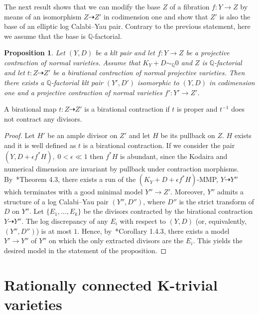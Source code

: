 \documentclass[11pt]{ip-journal}
\newtheorem{proposition}[theorem]{Proposition}
\theoremstyle{definition}
\begin{document}
The next result shows that we can modify the base $Z$ of a fibration $f \colon Y \to Z$ by means of an isomorphism $Z \dashrightarrow Z'$  in codimension one and show that $Z'$ is also the base of an elliptic log Calabi--Yau pair. Contrary to the previous statement, here we assume that the base is $\mathbb{Q}$-factorial.

\begin{proposition}
\label{bir.contr.lcy.prop}
Let $(Y, D)$ be a klt pair and let $f \colon Y \to Z$ be a projective contraction of normal varieties.
Assume that $K_Y+D \sim_{\mathbb{Q}} 0$ and $Z$ is $\mathbb{Q}$-factorial and let $t\colon Z \dashrightarrow Z'$ be a birational contraction of normal projective varieties.
Then there exists a $\mathbb{Q}$-factorial klt pair $(Y',D')$ isomorphic to $(Y, D)$ in codimension one and a projective contraction of normal varieties $f' \colon Y' \to Z'$.
\end{proposition}
 
A birational map $t \colon Z \dashrightarrow Z'$ is a birational contraction if $t$ is proper and $t^{-1}$ does not contract any divisors.

\begin{proof}
Let $H'$ be an ample divisor on $Z'$ and let $H$ be its pullback on $Z$. 
$H$ exists and it is well defined as $t$ is a birational contraction.
If we consider the pair $(Y, D+ \epsilon f^\ast H), \; 0<\epsilon\ll 1$ then $f^\ast H$ is abundant, since the Kodaira and numerical dimension are invariant by pullback under contraction morphisms. 
By~\cite{GL}*{Theorem 4.3}, there exists a run of the $(K_Y+D+\epsilon f^\ast H)$-MMP, $Y\dashrightarrow Y''$ which terminates with a good minimal model $Y'' \to Z'$.
Moreover, $Y''$ admits a structure of a log Calabi--Yau pair $(Y'', D'')$, where $D''$ is the strict transform of $D$ on $Y''$.
Let $\{E_1, \dots, E_k\}$ be the divisors contracted by the birational contraction $Y \dashrightarrow Y''$. 
The log discrepancy of any $E_i$ with respect to $(Y, D)$ (or, equivalently, $(Y'', D'')$) is at most $1$.
Hence, by~\cite{BCHM}*{Corollary 1.4.3}, there exists a model $Y' \to Y''$ of $Y''$ on which the only extracted divisors are the $E_i$.
This yields the desired model in the statement of the proposition.
\end{proof}

\section{Rationally connected K-trivial varieties}
\label{rc.cy.sect}
\end{document}
